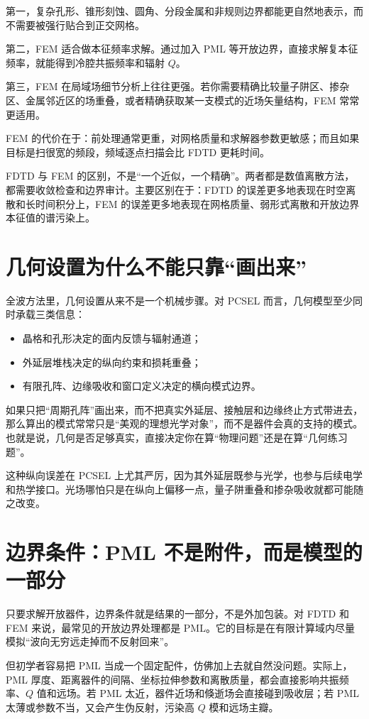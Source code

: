 第一，复杂孔形、锥形刻蚀、圆角、分段金属和非规则边界都能更自然地表示，而不需要被强行贴合到正交网格。

第二，FEM 适合做本征频率求解。通过加入 PML 等开放边界，直接求解复本征频率，就能得到冷腔共振频率和辐射 $Q$。

第三，FEM 在局域场细节分析上往往更强。若你需要精确比较量子阱区、掺杂区、金属邻近区的场重叠，或者精确获取某一支模式的近场矢量结构，FEM 常常更适用。

FEM 的代价在于：前处理通常更重，对网格质量和求解器参数更敏感；而且如果目标是扫很宽的频段，频域逐点扫描会比 FDTD 更耗时间。

FDTD 与 FEM 的区别，不是“一个近似，一个精确”。两者都是数值离散方法，都需要收敛检查和边界审计。主要区别在于：FDTD 的误差更多地表现在时空离散和长时间积分上，FEM 的误差更多地表现在网格质量、弱形式离散和开放边界本征值的谱污染上。

\section{几何设置为什么不能只靠“画出来”}
全波方法里，几何设置从来不是一个机械步骤。对 PCSEL 而言，几何模型至少同时承载三类信息：
\begin{itemize}
  \item 晶格和孔形决定的面内反馈与辐射通道；
  \item 外延层堆栈决定的纵向约束和损耗重叠；
  \item 有限孔阵、边缘吸收和窗口定义决定的横向模式边界。
\end{itemize}

如果只把“周期孔阵”画出来，而不把真实外延层、接触层和边缘终止方式带进去，那么算出的模式常常只是“美观的理想光学对象”，而不是器件会真的支持的模式。也就是说，几何是否足够真实，直接决定你在算“物理问题”还是在算“几何练习题”。

这种纵向误差在 PCSEL 上尤其严厉，因为其外延层既参与光学，也参与后续电学和热学接口。光场哪怕只是在纵向上偏移一点，量子阱重叠和掺杂吸收就都可能随之改变。

\section{边界条件：PML 不是附件，而是模型的一部分}
只要求解开放器件，边界条件就是结果的一部分，不是外加包装。对 FDTD 和 FEM 来说，最常见的开放边界处理都是 PML。它的目标是在有限计算域内尽量模拟“波向无穷远走掉而不反射回来”。

但初学者容易把 PML 当成一个固定配件，仿佛加上去就自然没问题。实际上，PML 厚度、距离器件的间隔、坐标拉伸参数和离散质量，都会直接影响共振频率、$Q$ 值和远场。若 PML 太近，器件近场和倏逝场会直接碰到吸收层；若 PML 太薄或参数不当，又会产生伪反射，污染高 $Q$ 模和远场主瓣。

